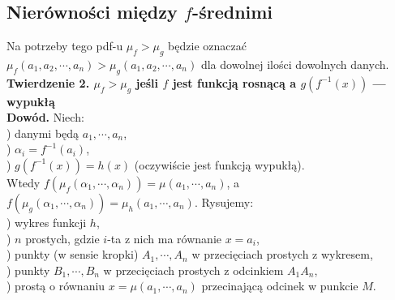 \documentclass{article}
\begin{document}
\subsection{Nierówności między $f$-średnimi}
Na potrzeby tego pdf-u $\mu_f>\mu_g$ będzie oznaczać $\mu_f(a_1,a_2,\cdots,a_n) > \mu_g(a_1,a_2,\cdots,a_n)$ dla dowolnej ilości dowolnych danych.\\
\textbf{Twierdzenie 2. $\mu_f>\mu_g$ jeśli $f$ jest funkcją rosnącą a $g(f^{-1}(x))$ --- wypukłą
\\Dowód. }Niech:
\\) danymi będą $a_1, \cdots, a_n$,
\\) $\alpha_i=f^{-1}(a_i)$, 
\\) $g(f^{-1}(x))=h(x)$ (oczywiście jest funkcją wypukłą).
\\Wtedy $f(\mu_f(\alpha_1,\cdots,\alpha_n))=\mu(a_1, \cdots, a_n)$, a $f(\mu_g(\alpha_1,\cdots,\alpha_n))=\mu_h(a_1, \cdots, a_n)$.
Rysujemy:
\\) wykres funkcji $h$,
\\) $n$ prostych, gdzie $i$-ta z nich ma równanie $x=a_i$,
\\) punkty (w sensie kropki) $A_1, \cdots, A_n$ w przecięciach prostych z wykresem,
\\) punkty $B_1, \cdots, B_n$ w przecięciach prostych z odcinkiem $A_1A_n$,
\\) prostą o równaniu $x=\mu(a_1, \cdots, a_n)$ przecinającą odcinek w punkcie $M$.
\end{document}

